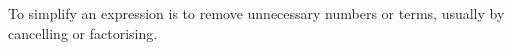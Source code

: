 To simplify an expression is to remove unnecessary
numbers or terms, usually by cancelling or factorising.